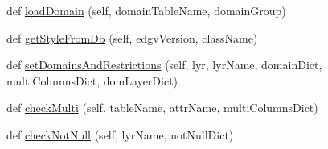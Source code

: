 \begin{DoxyCompactItemize}
\item 
def \mbox{\hyperlink{class_dsg_tools_1_1_factories_1_1_layer_loader_factory_1_1postgis_layer_loader_1_1_post_g_i_s_layer_loader_a337ead19d37879c82f062817fa2110ee}{load\+Domain}} (self, domain\+Table\+Name, domain\+Group)
\item 
def \mbox{\hyperlink{class_dsg_tools_1_1_factories_1_1_layer_loader_factory_1_1postgis_layer_loader_1_1_post_g_i_s_layer_loader_a483dea101d475bef18a47ca984f0c2c7}{get\+Style\+From\+Db}} (self, edgv\+Version, class\+Name)
\item 
def \mbox{\hyperlink{class_dsg_tools_1_1_factories_1_1_layer_loader_factory_1_1postgis_layer_loader_1_1_post_g_i_s_layer_loader_a240348693e7c7e44ec9de1ac924ee99a}{set\+Domains\+And\+Restrictions}} (self, lyr, lyr\+Name, domain\+Dict, multi\+Columns\+Dict, dom\+Layer\+Dict)
\item 
def \mbox{\hyperlink{class_dsg_tools_1_1_factories_1_1_layer_loader_factory_1_1postgis_layer_loader_1_1_post_g_i_s_layer_loader_ab900892c310136c038574363524b98c0}{check\+Multi}} (self, table\+Name, attr\+Name, multi\+Columns\+Dict)
\item 
def \mbox{\hyperlink{class_dsg_tools_1_1_factories_1_1_layer_loader_factory_1_1postgis_layer_loader_1_1_post_g_i_s_layer_loader_a18448c4aaba1d0027c0ac9c29eaa7280}{check\+Not\+Null}} (self, lyr\+Name, not\+Null\+Dict)
\end{DoxyCompactItemize}
